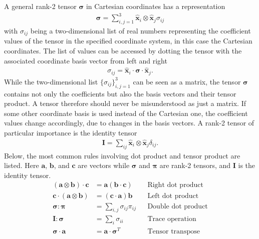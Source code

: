 A general rank-2 tensor $\bm{\sigma}$ in Cartesian coordinates has a representation
\begin{align}
    \bm{\sigma}=\sum_{i,j=1}^{3}\bm{\hat{x}}_i\otimes\bm{\hat{x}}_j\sigma_{ij}
\end{align}
with $\sigma_{ij}$ being a two-dimensional list of real numbers representing the coefficient values of the tensor in the specified coordinate system, in this case the Cartesian coordinates. The list of values can be accessed by dotting the tensor with the associated coordinate basis vector from left and right
\begin{align}
    \sigma_{ij}=\bm{\hat{x}}_i\cdot\bm{\sigma}\cdot\bm{\hat{x}}_j.
\end{align}
While the two-dimensional list $\{\sigma_{ij}\}_{i,j=1}^3$ can be seen as a matrix, the tensor $\bm{\sigma}$ contains not only the coefficients but also the basis vectors and their tensor product. A tensor therefore should never be misunderstood as just a matrix. If some other coordinate basis is used instead of the Cartesian one, the coefficient values change accordingly, due to changes in the basis vectors. A rank-2 tensor of particular importance is the identity tensor
\begin{align}
    \bm{I}=\sum_{ij}\bm{\hat{x}}_i\otimes\bm{\hat{x}}_j\delta_{ij}.
\end{align}
Below, the most common rules involving dot product and tensor product are listed. Here $\bm{a}$, $\bm{b}$, and $\bm{c}$ are vectors while $\bm{\sigma}$ and $\bm{\pi}$ are rank-2 tensors, and $\bm{I}$ is the identity tensor.
\begin{align}
(\bm{a} \otimes \bm{b}) \cdot \bm{c} &= \bm{a}(\bm{b} \cdot \bm{c}) && \text{Right dot product} \\
\bm{c} \cdot (\bm{a} \otimes \bm{b}) &= (\bm{c} \cdot \bm{a})\bm{b} && \text{Left dot product} \\
\bm{\sigma} : \bm{\pi} &= \sum_{i,j} \sigma_{ij} \pi_{ij} && \text{Double dot product} \\
\bm{I} : \bm{\sigma}&= \sum_{i}\sigma_{ii} && \text{Trace operation} \\
\bm{\sigma}\cdot\bm{a}&= \bm{a}\cdot\bm{\sigma}^T  && \text{Tensor transpose}
\end{align}
